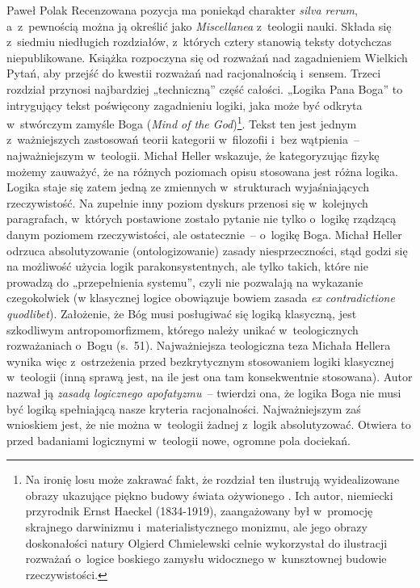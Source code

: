 \begin{recplenv}{Paweł Polak}
Recenzowana pozycja ma poniekąd charakter \textit{silva rerum}, a~z~pewnością
można ją określić jako \textit{Miscellanea} z~teologii nauki. Składa się z~siedmiu
niedługich rozdziałów, z~których cztery stanowią teksty dotychczas niepublikowane. Książka rozpoczyna się od rozważań
nad zagadnieniem Wielkich Pytań, aby przejść do kwestii rozważań nad racjonalnością i~sensem. Trzeci rozdział przynosi
najbardziej „techniczną” część całości. „Logika Pana Boga” to intrygujący tekst poświęcony zagadnieniu logiki, jaka
może być odkryta w~stwórczym zamyśle Boga (\textit{Mind of the God})\footnote{Na
ironię losu może zakrawać fakt, że rozdział ten ilustrują wyidealizowane obrazy ukazujące piękno budowy świata
ożywionego
\parencite{haeckel_kunstformen_1904}.
Ich autor, niemiecki przyrodnik Ernst Haeckel (1834-1919), zaangażowany był w~promocję
skrajnego darwinizmu i~materialistycznego monizmu, ale jego obrazy doskonałości natury Olgierd Chmielewski celnie
wykorzystał do ilustracji rozważań o~logice boskiego zamysłu widocznego w~kunsztownej budowie rzeczywistości.}. Tekst
ten jest jednym z~ważniejszych zastosowań teorii kategorii w~filozofii i~bez wątpienia~-- najważniejszym w~teologii.
Michał Heller wskazuje, że kategoryzując fizykę możemy zauważyć, że na różnych poziomach opisu stosowana jest różna
logika. Logika staje się zatem jedną ze zmiennych w~strukturach wyjaśniających rzeczywistość. Na zupełnie inny poziom
dyskurs przenosi się w~kolejnych paragrafach, w~których postawione zostało pytanie nie tylko o~logikę rządzącą danym
poziomem rzeczywistości, ale ostatecznie~-- o~logikę Boga. Michał Heller odrzuca absolutyzowanie (ontologizowanie)
zasady niesprzeczności, stąd godzi się na możliwość użycia logik parakonsystentnych, ale tylko takich, które nie
prowadzą do „przepełnienia systemu”, czyli nie pozwalają na wykazanie czegokolwiek (w klasycznej logice obowiązuje
bowiem zasada \textit{ex contradictione quodlibet}). Założenie, że Bóg musi
posługiwać się logiką klasyczną, jest szkodliwym antropomorfizmem, którego należy unikać w~teologicznych rozważaniach o~Bogu
(s.~51). Najważniejsza teologiczna teza Michała Hellera wynika więc z~ostrzeżenia przed bezkrytycznym stosowaniem
logiki klasycznej w~teologii (inną sprawą jest, na ile jest ona tam konsekwentnie stosowana). Autor nazwał ją
\textit{zasadą logicznego apofatyzmu}~-- twierdzi ona, że logika Boga nie musi być
logiką spełniającą nasze kryteria racjonalności. Najważniejszym zaś wnioskiem jest, że nie można w~teologii żadnej z~logik
absolutyzować. Otwiera to przed badaniami logicznymi w~teologii nowe, ogromne pola dociekań.


\end{recplenv}
